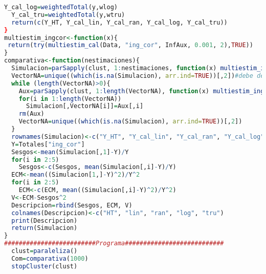 \documentclass[a4paper,twoside,openright,12pt]{book}
\theoremstyle{definition}
\numberwithin{equation}{chapter}
\numberwithin{figure}{chapter}
\numberwithin{table}{chapter}
\numberwithin{theorem}{chapter}
\numberwithin{lemma}{chapter}
\begin{document}
\begin{lstlisting}[language=R]
  Y_cal_log=weightedTotal(y,wlog)
  Y_cal_tru=weightedTotal(y,wtru)
  return(c(Y_HT, Y_cal_lin, Y_cal_ran, Y_cal_log, Y_cal_tru))
}
multiestim_ingcor<-function(x){
 return(try(multiestim_cal(Data, "ing_cor", InfAux, 0.001, 2),TRUE))
}
comparativa<-function(nestimaciones){
  Simulacion=parSapply(clust, 1:nestimaciones, function(x) multiestim_ingcor(x))#aqui es un arreglo multidimensional
  VectorNA=unique((which(is.na(Simulacion), arr.ind=TRUE))[,2])#debe determinar solo el renglon
  while (length(VectorNA)>0){
    Aux=parSapply(clust, 1:length(VectorNA), function(x) multiestim_ingcor(x))
    for(i in 1:length(VectorNA))
      Simulacion[,VectorNA[i]]=Aux[,i]
    rm(Aux)
    VectorNA=unique((which(is.na(Simulacion), arr.ind=TRUE))[,2])
  }
  rownames(Simulacion)<-c("Y_HT", "Y_cal_lin", "Y_cal_ran", "Y_cal_log", "Y_cal_tru")
  Y=Totales["ing_cor"]
  Sesgos<-mean(Simulacion[,1]-Y)/Y
  for(i in 2:5)
    Sesgos<-c(Sesgos, mean(Simulacion[,i]-Y)/Y)
  ECM<-mean((Simulacion[1,]-Y)^2)/Y^2
  for(i in 2:5)
    ECM<-c(ECM, mean((Simulacion[,i]-Y)^2)/Y^2)
  V<-ECM-Sesgos^2
  Descripcion=rbind(Sesgos, ECM, V)
  colnames(Descripcion)<-c("HT", "lin", "ran", "log", "tru")
  print(Descripcion)
  return(Simulacion)
}
#########################Programa###########################
  clust=paraleliza()
  Com=comparativa(1000)
  stopCluster(clust)
\end{lstlisting}
\end{document}

